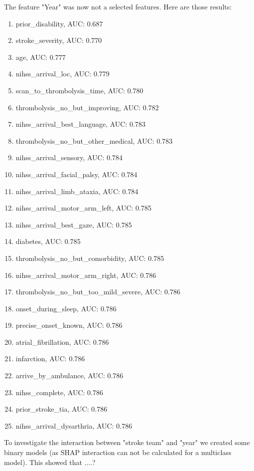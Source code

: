 \begin{enumerate}
    The feature "Year" was now not a selected features. Here are those results:
    \begin{enumerate}
        \item prior\_disability, AUC: 0.687
        \item stroke\_severity, AUC: 0.770
        \item age, AUC: 0.777
        \item nihss\_arrival\_loc, AUC: 0.779
        \item scan\_to\_thrombolysis\_time, AUC: 0.780
        \item thrombolysis\_no\_but\_improving, AUC: 0.782
        \item nihss\_arrival\_best\_language, AUC: 0.783
        \item  thrombolysis\_no\_but\_other\_medical, AUC: 0.783
        \item nihss\_arrival\_sensory, AUC: 0.784
        \item nihss\_arrival\_facial\_palsy, AUC: 0.784
        \item nihss\_arrival\_limb\_ataxia, AUC: 0.784
        \item nihss\_arrival\_motor\_arm\_left, AUC: 0.785
        \item nihss\_arrival\_best\_gaze, AUC: 0.785
        \item diabetes, AUC: 0.785
        \item thrombolysis\_no\_but\_comorbidity, AUC: 0.785
        \item nihss\_arrival\_motor\_arm\_right, AUC: 0.786
        \item thrombolysis\_no\_but\_too\_mild\_severe, AUC: 0.786
        \item onset\_during\_sleep, AUC: 0.786
        \item precise\_onset\_known, AUC: 0.786
        \item atrial\_fibrillation, AUC: 0.786
        \item infarction, AUC: 0.786
        \item arrive\_by\_ambulance, AUC: 0.786
        \item nihss\_complete, AUC: 0.786
        \item prior\_stroke\_tia, AUC: 0.786
        \item nihss\_arrival\_dysarthria, AUC: 0.786
    \end{enumerate}

    To investigate the interaction between "stroke team" and "year" we created some binary models (as SHAP interaction can not be calculated for a multiclass model). This showed that ....?


\end{enumerate}
